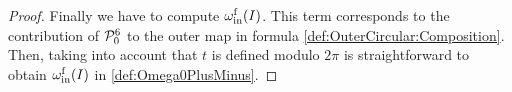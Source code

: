 \begin{proof}
Finally we have to compute $\omega_{\mathrm{in}}^{\mathrm{f}}(I)$. This term corresponds to the contribution of $\mathcal{P}^6_0$ to the outer map in formula \eqref{def:OuterCircular:Composition}. Then, taking into account that $t$ is defined modulo $2\pi$ is straightforward to obtain  $\omega_{\mathrm{in}}^{\mathrm{f}}(I)$ in \eqref{def:Omega0PlusMinus}.
\end{proof}










